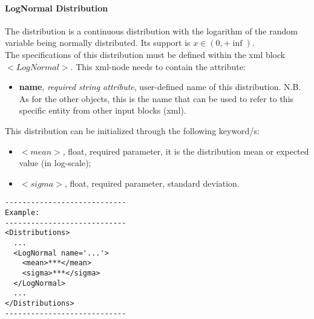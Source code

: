 \paragraph{LogNormal Distribution}
\label{LogNormal}
The  distribution is a continuous distribution
with the logarithm of the random variable being normally distributed. Its support is $x \in (0, +\inf)$.
\\ The specifications of this distribution must be defined within the xml block $<LogNormal>$. This xml-node needs to contain the attribute:
\vspace{-5mm}
\begin{itemize}
\itemsep0em
\item \textbf{name}, \textit{required string attribute}, user-defined name of this distribution. N.B. As for the other objects, this is the name that can be used to refer to this specific entity from other input blocks (xml).   
\end{itemize}
\vspace{-5mm}
This distribution can be initialized through the following keyword/s:
\begin{itemize}
\item $<mean>$, float, required parameter, it is the distribution mean or expected value (in log-scale);
\item $<sigma>$, float, required parameter, standard deviation.
\end{itemize}

\begin{lstlisting}[style=XML]
----------------------------
Example:
----------------------------
<Distributions>
  ...
  <LogNormal name='...'>
    <mean>***</mean>
    <sigma>***</sigma>
  </LogNormal>
  ...
</Distributions>
----------------------------
\end{lstlisting}

